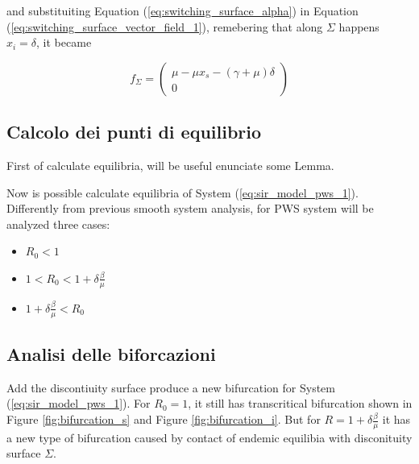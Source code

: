and substituiting Equation (\ref{eq:switching_surface_alpha}) in Equation (\ref{eq:switching_surface_vector_field_1}), remebering that along $\Sigma$ happens $x_i = \delta$,  it became

\begin{equation}
    \label{eq:switching_surface_vector_field_2}
    f_\Sigma = \begin{pmatrix} \mu - \mu x_s - (\gamma +\mu) \delta \\ 0 \end{pmatrix}
\end{equation}

\subsection{Calcolo dei punti di equilibrio}

First of calculate equilibria, will be useful enunciate some Lemma.





Now is possible calculate equilibria of System (\ref{eq:sir_model_pws_1}). Differently from previous smooth system analysis, for PWS system will be analyzed three cases:
\begin{itemize}
    \item $R_0 < 1$
    \item $1 < R_0 < 1+\delta\frac{\beta}{\mu}$
    \item $1+\delta\frac{\beta}{\mu} < R_0$
\end{itemize}







\subsection{Analisi delle biforcazioni}
Add the discontiuity surface produce a new bifurcation for System (\ref{eq:sir_model_pws_1}).
For $R_0 = 1$, it still has transcritical bifurcation shown in Figure \ref{fig:bifurcation_s} and Figure \ref{fig:bifurcation_i}.
But for $ R = 1+\delta\frac{\beta}{\mu}$ it has a new type of bifurcation caused by contact of endemic equilibia with disconituity surface $\Sigma$.



